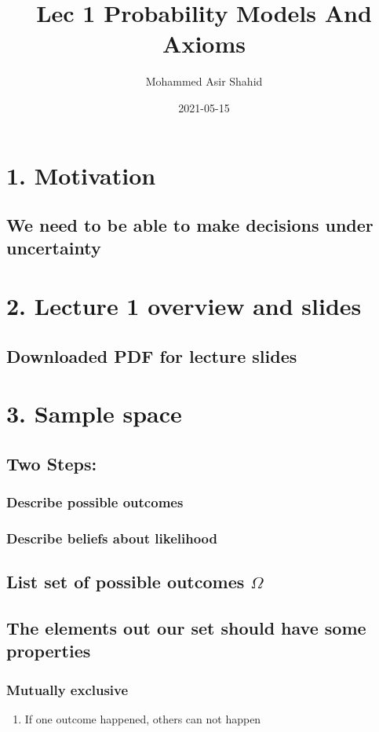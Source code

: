 \documentclass[11pt]{article}
\author{Mohammed Asir Shahid}
\date{2021-05-15}
\title{Lec 1 Probability Models And Axioms}
\begin{document}
\maketitle
\tableofcontents


\section{1. Motivation}
\label{sec:org66f124c}
\subsection{We need to be able to make decisions under uncertainty}
\label{sec:org4d31840}
\section{2. Lecture 1 overview and slides}
\label{sec:org178cf39}
\subsection{Downloaded PDF for lecture slides}
\label{sec:orge5fc4d0}
\section{3. Sample space}
\label{sec:orgd6394fd}
\subsection{Two Steps:}
\label{sec:org7318679}
\subsubsection{Describe possible outcomes}
\label{sec:org04cc902}
\subsubsection{Describe beliefs about likelihood}
\label{sec:org50a5ef9}
\subsection{List set of possible outcomes \(\Omega\)}
\label{sec:orgffd9c6c}
\subsection{The elements out our set should have some properties}
\label{sec:org9e1d51f}
\subsubsection{Mutually exclusive}
\label{sec:orgeb72d47}
\begin{enumerate}
\item If one outcome happened, others can not happen
\label{sec:org80ac1cd}
\end{enumerate}
\end{document}
